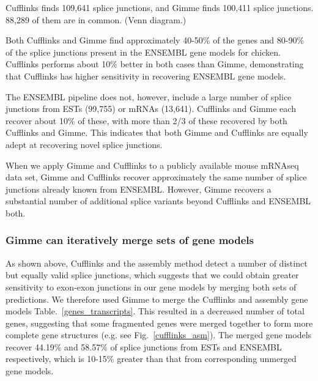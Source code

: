 \documentclass[10pt]{article}
\begin{document}
Cufflinks finds 109,641 splice junctions, and Gimme finds 100,411
splice junctions.  88,289 of them are in common.  (Venn diagram.)

Both Cufflinks and Gimme find approximately 40-50\% of the genes and
80-90\% of the splice junctions present in the ENSEMBL gene models
for chicken.  Cufflinks performs about 10\% better in both cases
than Gimme, demonstrating that Cufflinks has higher sensitivity
in recovering ENSEMBL gene models.

The ENSEMBL pipeline does not, however, include a large number of
splice junctions from ESTs (99,755) or mRNAs (13,641).  Cufflinks and
Gimme each recover about 10\% of these, with more than 2/3 of these
recovered by both Cufflinks and Gimme.  This indicates that both Gimme
and Cufflinks are equally adept at recovering novel splice junctions.


When we apply Gimme and Cufflinks to a publicly available mouse
mRNAseq data set, Gimme and Cufflinks recover approximately the same
number of splice junctions already known from ENSEMBL.  However, Gimme
recovers a substantial number of additional splice variants beyond
Cufflinks and ENSEMBL both.


\subsubsection*{Gimme can iteratively merge sets of gene models}


As shown above, Cufflinks and the assembly method detect a number of
distinct but equally valid splice junctions, which suggests that we
could obtain greater sensitivity to exon-exon junctions in our gene
models by merging both sets of predictions.
We therefore used Gimme to merge the Cufflinks and assembly gene
models Table.~\ref{genes_transcripts}.  This resulted in a decreased
number of total genes, suggesting that some fragmented genes were
merged together to form more complete gene structures (e.g. see
Fig.~\ref{cufflinks_asm}). The merged gene models recover 44.19\% and
58.57\% of splice junctions from ESTs and ENSEMBL respectively, which is
10-15\% greater than that from corresponding unmerged gene models.
\end{document}

